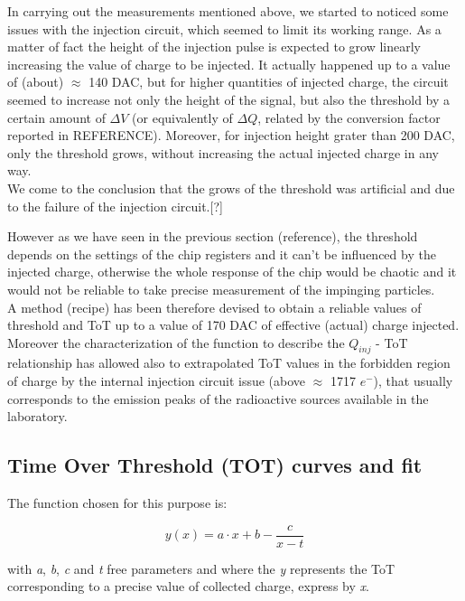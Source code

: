 
In carrying out the measurements mentioned above, we started to noticed some issues with the injection circuit, which seemed to limit its working range. As a matter of fact the height of the injection pulse is expected to grow linearly increasing the value of charge to be injected.
It actually happened up to a value of (about) $\approx$ 140 DAC, but for higher quantities of injected charge, the circuit seemed to increase not only the height of the signal, but also the threshold by a certain amount of $\Delta V$ (or equivalently of $\Delta Q$, related by the conversion factor reported in REFERENCE). Moreover, for injection height grater than 200 DAC, only the threshold grows, without increasing the actual injected charge in any way.\\
We come to the conclusion that the grows of the threshold was artificial and due to the failure of the injection circuit.[?]

However as we have seen in the previous section (reference), the threshold depends on the settings of the chip registers and it can't be influenced by the injected charge, otherwise the whole response of the chip would be chaotic and it would not be reliable to take precise measurement of the impinging particles. \\

A method (recipe) has been therefore devised to obtain a reliable values of threshold and ToT up to a value of 170 DAC of effective (actual) charge injected. Moreover the characterization of the function to describe the $Q_{inj}$ - ToT relationship has allowed also to extrapolated ToT values in the forbidden region of charge by the internal injection circuit issue (above $\approx$ 1717 $e^{-}$), that usually corresponds to the emission peaks of the radioactive sources available in the laboratory.


\subsection{Time Over Threshold (TOT) curves and fit} \label{tot_fit}

The function chosen for this purpose is:

\begin{equation}
y(x) = a\cdot x +b -\frac{c}{x-t}
\label{fit_function}
\end{equation}

with \textit{a}, \textit{b}, \textit{c} and \textit{t} free parameters and where the \textit{y} represents the ToT corresponding to a precise value of collected charge, express by \textit{x}. 

